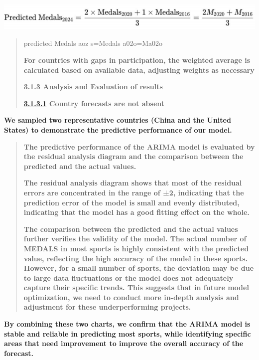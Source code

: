 \documentclass[12pt,a4paper]{article}
\renewenvironment{quote}{\begin{quotation}}{\end{quotation}}  %
\begin{document}
    \includegraphics[width=5.64667in,height=0.54in]{./media/media/image8.png}
    
    \begin{quote}
    predicted Medals aoz s=Medals a02o=Ma02o
    
    \textbf{For countries with gaps in participation, the weighted average
    is calculated based on available data, adjusting weights as necessary}
    
    \protect{}\label{bookmark11-1}{}\textbf{3.1.3 Analysis and
    Evaluation of results}
    
    \textbf{\url{3.1.3.1} Country forecasts are not absent}
    \end{quote}
    
    \textbf{We sampled two representative countries (China and the United
    States) to demonstrate the predictive performance of our model.}
    
    \begin{quote}
    \textbf{The predictive performance of the ARIMA model is evaluated by
    the residual analysis diagram and the comparison between the predicted
    and the actual values.}
    
    \textbf{The residual analysis diagram shows that most of the residual
    errors are concentrated in the range of ±2, indicating that the
    prediction error of the model is small and evenly distributed,
    indicating that the model has a good fitting effect on the whole.}
    
    \textbf{The comparison between the predicted and the actual values
    further verifies the validity of the model. The actual number of MEDALS
    in most sports is highly consistent with the predicted value, reflecting
    the high accuracy of the model in these sports. However, for a small
    number of sports, the deviation may be due to large data fluctuations or
    the model does not adequately capture their specific trends. This
    suggests that in future model optimization, we need to conduct more
    in-depth analysis and adjustment for these underperforming projects.}
    \end{quote}
    
    \textbf{By combining these two charts, we confirm that the ARIMA model
    is stable and reliable in predicting most sports, while identifying
    specific areas that need improvement to improve the overall accuracy of
    the forecast.}
    
\end{document}
